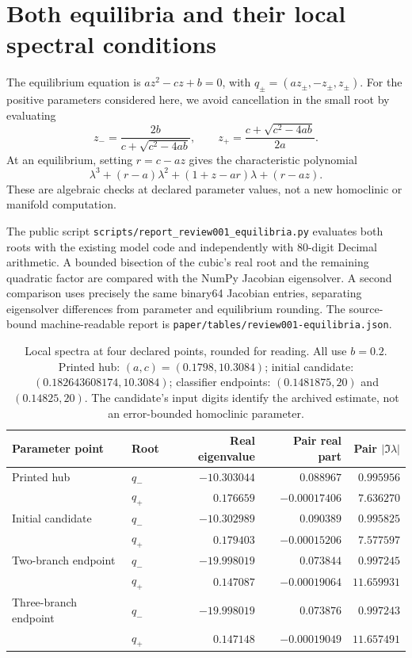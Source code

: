 \section{Both equilibria and their local spectral conditions}
\label{supp:equilibria}

The equilibrium equation is $az^2-cz+b=0$, with
$q_\pm=(az_\pm,-z_\pm,z_\pm)$. For the positive parameters considered here,
we avoid cancellation in the small root by evaluating
\[
 z_-=\frac{2b}{c+\sqrt{c^2-4ab}},\qquad
 z_+=\frac{c+\sqrt{c^2-4ab}}{2a}.
\]
At an equilibrium, setting $r=c-az$ gives the characteristic polynomial
\[
 \lambda^3+(r-a)\lambda^2+(1+z-ar)\lambda+(r-az).
\]
These are algebraic checks at declared parameter values, not a new
homoclinic or manifold computation.

The public script \texttt{scripts/report\_review001\_equilibria.py}
evaluates both roots with the existing model code and independently with
80-digit Decimal arithmetic. A bounded bisection of the cubic's real root
and the remaining quadratic factor are compared with the NumPy Jacobian
eigensolver. A second comparison uses precisely the same binary64 Jacobian
entries, separating eigensolver differences from parameter and equilibrium
rounding. The source-bound machine-readable report is
\texttt{paper/tables/review001-equilibria.json}.

\begin{table}[H]
\centering
\small
\renewcommand{\arraystretch}{1.15}
\begin{tabular}{@{}llrrr@{}}
\toprule
Parameter point & Root & Real eigenvalue & Pair real part & Pair $|\Im\lambda|$ \\
\midrule
Printed hub & $q_-$ & $-10.303044$ & $0.088967$ & $0.995956$ \\
 & $q_+$ & $0.176659$ & $-0.00017406$ & $7.636270$ \\
Initial candidate & $q_-$ & $-10.302989$ & $0.090389$ & $0.995825$ \\
 & $q_+$ & $0.179403$ & $-0.00015206$ & $7.577597$ \\
Two-branch endpoint & $q_-$ & $-19.998019$ & $0.073844$ & $0.997245$ \\
 & $q_+$ & $0.147087$ & $-0.00019064$ & $11.659931$ \\
Three-branch endpoint & $q_-$ & $-19.998019$ & $0.073876$ & $0.997243$ \\
 & $q_+$ & $0.147148$ & $-0.00019049$ & $11.657491$ \\
\bottomrule
\end{tabular}
\caption{Local spectra at four declared points, rounded for reading. All
use $b=0.2$. Printed hub: $(a,c)=(0.1798,10.3084)$; initial candidate:
$(0.182643608174,10.3084)$; classifier endpoints:
$(0.1481875,20)$ and $(0.14825,20)$. The candidate's input digits identify
the archived estimate, not an error-bounded homoclinic parameter.}
\label{tab:both-equilibria}
\end{table}

